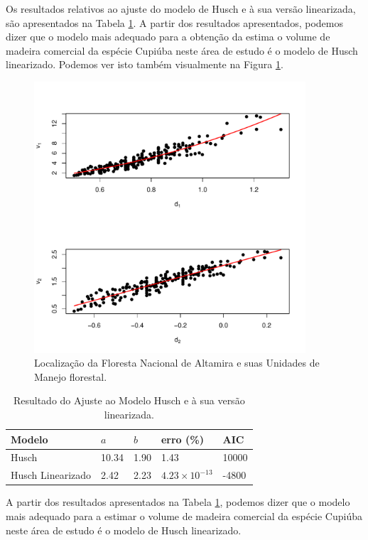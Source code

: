 \documentclass[a4paper,12pt]{article}
\begin{document}
Os resultados relativos ao ajuste do modelo de Husch e à sua versão linearizada, são apresentados na Tabela \ref{t2}. A partir dos resultados apresentados, podemos dizer que o modelo mais adequado para a obtenção da estima o volume de madeira comercial da espécie Cupiúba neste área de estudo é o modelo de Husch linearizado. Podemos ver isto também visualmente na Figura \ref{f1}.

\begin{figure}[H]
\centering
\includegraphics[width=0.9\textwidth]{result.pdf}
\caption{Localização da Floresta Nacional de Altamira e suas Unidades de Manejo florestal.}
\label{f1}
\end{figure}

\begin{table}[h]
\centering 
\caption{Resultado do Ajuste ao Modelo Husch e à sua versão linearizada.} 
\label{t2}
\begin{tabular}{lllll}
\hline
Modelo & $a$ & $b$ & erro (\%)  & AIC \\
\hline
Husch & 10.34 & 1.90 & 1.43 &  10000\\
Husch Linearizado & 2.42 & 2.23 & $4.23 \times 10^{-13}$ & -4800 \\
\hline
\end{tabular}
\end{table}

A partir dos resultados apresentados na Tabela \ref{t2}, podemos dizer que o modelo mais adequado para a estimar o volume de madeira comercial da espécie Cupiúba neste área de estudo é o modelo de Husch linearizado.
\end{document}
